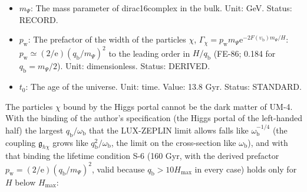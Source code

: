 \documentclass[
  10pt,
]{article}
\begin{document}
\begin{itemize}
  \(\upsilon_{\mathrm{r}} = \omega_{\mathrm{r}}/m_\Psi\) that of the
  real part of its resonance. Unit: dimensionless. Status: DERIVED.
\item
  \(m_\Psi\): The mass parameter of dirac16complex in the bulk. Unit:
  GeV. Status: RECORD.
\item
  \(p_{\mathrm{w}}\): The prefactor of the width of the particles
  \(\chi\),
  \(\Gamma_\chi = p_{\mathrm{w}}m_\Psi\mathrm{e}^{-2F(\upsilon_{\mathrm{b}})m_\Psi/H}\):
  \(p_{\mathrm{w}} \simeq (2/\mathrm{e})(q_{\mathrm{b}}/m_\Psi)^2\) to
  the leading order in \(H/q_{\mathrm{b}}\) (FE-86; 0.184 for
  \(q_{\mathrm{b}} = m_\Psi/2\)). Unit: dimensionless. Status: DERIVED.
\item
  \(t_0\): The age of the universe. Unit: time. Value: 13.8 Gyr. Status:
  STANDARD.
\end{itemize}

The particles \(\chi\) bound by the Higgs portal cannot be the dark
matter of UM-4. With the binding of the author's specification (the
Higgs portal of the left-handed half) the largest
\(q_{\mathrm{b}}/\omega_{\mathrm{b}}\) that the LUX-ZEPLIN limit allows
falls like \(\omega_{\mathrm{b}}^{-1/4}\) (the coupling
\(\mathfrak{g}_{h\chi}\) grows like
\(q_{\mathrm{b}}^2/\omega_{\mathrm{b}}\), the limit on the cross-section
like \(\omega_{\mathrm{b}}\)), and with that binding the lifetime
condition S-6 (160 Gyr, with the derived prefactor
\(p_{\mathrm{w}} = (2/\mathrm{e})(q_{\mathrm{b}}/m_\Psi)^2\), valid
because \(q_{\mathrm{b}} > 10H_{\max}\) in every case) holds only for
\(H\) below \(H_{\max}\):
\end{document}
